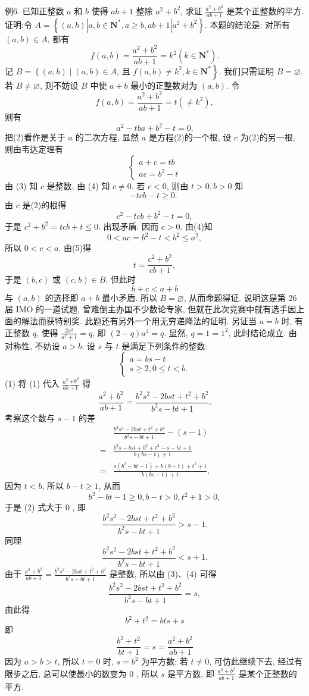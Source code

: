 例6. 已知正整数 $a$ 和 $b$ 使得 $a b+1$ 整除 $a^2+b^2$, 求证 $\frac{a^2+b^2}{a b+1}$ 是某个正整数的平方.
证明:令 $A=\left\{(a, b)\left|a, b \in \mathbf{N}^*, a \geqslant b, a b+1\right| a^2+b^2\right\}$. 本题的结论是: 对所有 $(a, b) \in A$, 都有
$$
f(a, b)=\frac{a^2+b^2}{a b+1}=k^2\left(k \in \mathbf{N}^*\right) .
$$
记 $B=\left\{(a, b) \mid(a, b) \in A\right.$, 且 $\left.f(a, b) \neq k^2, k \in \mathbf{N}^*\right\}$. 我们只需证明 $B=\varnothing$.
若 $B \neq \varnothing$, 则不妨设 $B$ 中使 $a+b$ 最小的正整数对为 $(a, b)$. 令
$$
f(a, b)=\frac{a^2+b^2}{a b+1}=t\left(\neq k^2\right),
$$
则有
$$
a^2-t b a+b^2-t=0 .
$$
把(2)看作是关于 $a$ 的二次方程, 显然 $a$ 是方程(2)的一个根, 设 $c$ 为(2)的另一根, 则由韦达定理有
$$
\left\{\begin{array}{l}
a+c=t b \\
a c=b^2-t
\end{array}\right.
$$
由 (3) 知 $c$ 是整数, 由 (4) 知 $c \neq 0$.
若 $c<0$, 则由 $t>0, b>0$ 知
$$
-t c b-t \geqslant 0 \text {. }
$$
由 $c$ 是(2)的根得
$$
c^2-t c b+b^2-t=0,
$$
于是 $c^2+b^2=t c b+t \leqslant 0$. 出现矛盾.
因而 $c>0$. 由(4)知
$$
0<a c=b^2-t<b^2 \leqslant a^2,
$$
所以 $0<c<a$. 由(5)得
$$
t=\frac{c^2+b^2}{c b+1},
$$
于是 $(b, c)$ 或 $(c, b) \in B$. 但此时
$$
b+c<a+b
$$
与 $(a, b)$ 的选择即 $a+b$ 最小矛盾.
所以 $B=\varnothing$, 从而命题得证.
说明这是第 26 届 IMO 的一道试题, 曾难倒主办国不少数论专家, 但就在此次竞赛中就有选手因上面的解法而获特别奖.
此题还有另外一个用无穷递降法的证明.
另证当 $a=b$ 时, 有正整数 $q$, 使得 $\frac{2 a^2}{a^2+1}=q$, 即 $(2-q) a^2=q$.
显然, $q=1=1^2$, 此时结论成立.
由对称性, 不妨设 $a>b$.
设 $s$ 与 $t$ 是满足下列条件的整数:
$$
\left\{\begin{array}{l}
a=b s-t \\
s \geqslant 2,0 \leqslant t<b .
\end{array}\right.
$$
(1)
将 (1) 代入 $\frac{a^2}{a b} \frac{+b^2}{+1}$ 得
$$
\frac{a^2+b^2}{a b+1}=\frac{b^2 s^2-2 b s t+t^2+b^2}{b^2 s-b t+1} .
$$
考察这个数与 $s-1$ 的差
$$
\begin{aligned}
& \frac{b^2 s^2-2 b s t+t^2+b^2}{b^2 s-b t+1}-(s-1) \\
= & \frac{b^2 s-b s t+b^2+t^2-s-b t+1}{b(b s-t)+1} \\
= & \frac{s\left(b^2-b t-1\right)+b(b-t)+t^2+1}{b(b s-t)+1} .
\end{aligned}
$$
因为 $t<b$, 所以 $b-t \geqslant 1$, 从而
$$
b^2-b t-1 \geqslant 0, b-t>0, t^2+1>0,
$$
于是 (2) 式大于 0 , 即
$$
\frac{b^2 s^2-2 b s t+t^2+b^2}{b^2 s-b t+1}>s-1 .
$$
同理
$$
\frac{b^2 s^2-2 b s t+t^2+b^2}{b^2 s-b t+1}<s+1 .
$$
由于 $\frac{a^2+b^2}{a b+1}=\frac{b^2 s^2-2 b s t+t^2+b^2}{b^2 s-b t+1}$ 是整数, 所以由 (3)、(4) 可得
$$
\frac{b^2 s^2-2 b s t+t^2+b^2}{b^2 s-b t+1}=s,
$$
由此得
$$
b^2+t^2=b t s+s
$$
即
$$
\frac{b^2+t^2}{b t+1}=s=\frac{a^2+b^2}{a b+1}
$$
因为 $a>b>t$, 所以 $t=0$ 时, $s=b^2$ 为平方数; 若 $t \neq 0$, 可仿此继续下去, 经过有限步之后, 总可以使最小的数变为 0 , 所以 $s$ 是平方数, 即 $\frac{a^2+b^2}{a b+1}$ 是某个正整数的平方.



